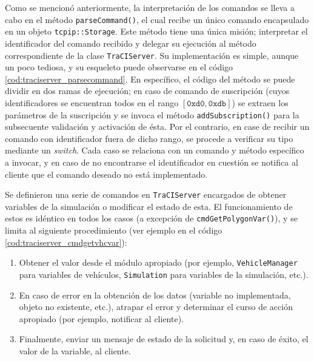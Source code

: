 

Como se mencionó anteriormente, la interpretación de los comandos se lleva a cabo en el método \texttt{parseCommand()}, el cual recibe un único comando encapsulado en un objeto \texttt{tcpip::Storage}. Este método tiene una única misión; interpretar el identificador del comando recibido y delegar su ejecución al método correspondiente de la clase \texttt{TraCIServer}. Su implementación es simple, aunque un poco tediosa, y su esqueleto puede observarse en el código \ref{cod:traciserver_parsecommand}. En específico, el código del método se puede dividir en dos ramas de ejecución; en caso de comando de suscripción (cuyos identificadores se encuentran todos en el rango $[\texttt{0xd0}, \texttt{0xdb}]$) se extraen los parámetros de la suscripción y se invoca el método \texttt{addSubscription()} para la subsecuente validación y activación de ésta. Por el contrario, en case de recibir un comando con identificador fuera de dicho rango, se procede a verificar su tipo mediante un \emph{switch}. Cada caso se relaciona con un comando y método específico a invocar, y en caso de no encontrarse el identificador en cuestión se notifica al cliente que el comando deseado no está implementado.



Se definieron una serie de comandos en \texttt{TraCIServer} encargados de obtener variables de la simulación o modificar el estado de esta. El funcionamiento de estos es idéntico en todos los casos (a excepción de \texttt{cmdGetPolygonVar()}), y se limita al siguiente procedimiento (ver ejemplo en el código \ref{cod:traciserver_cmdgetvhcvar}):

\begin{enumerate}
    \item Obtener el valor desde el módulo apropiado (por ejemplo, \texttt{VehicleManager} para variables de vehículos, \texttt{Simulation} para variables de la simulación, etc.).
    \item En caso de error en la obtención de los datos (variable no implementada, objeto no existente, etc.), atrapar el error y determinar el curso de acción apropiado (por ejemplo, notificar al cliente).
    \item Finalmente, enviar un mensaje de estado de la solicitud y, en caso de éxito, el valor de la variable, al cliente.
\end{enumerate}

